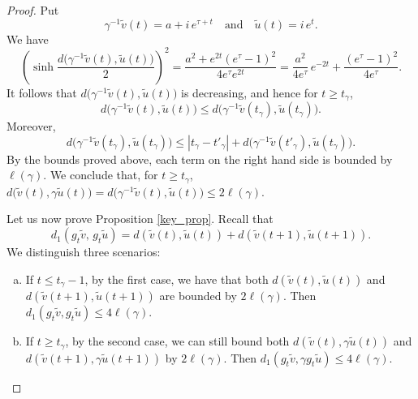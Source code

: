\documentclass[a4paper,english,reqno]{amsart}
\theoremstyle{definition}
\numberwithin{equation}{section}
\begin{document}
\begin{proof}
 	Put
 	\[
 	\gamma^{-1}\tilde v(t)=a+i\,e^{\tau+t}\quad\text{and}\quad \tilde u(t)=i\,e^{t}.
 	\]
 	We have \cite[\S7.20]{Beardon} 
 	\begin{equation*}%
 		\left(\sinh\frac{d\bigl(\gamma^{-1}\tilde v(t),\tilde u(t)\bigr)}{2}\right)^{2}
 		=
 		\frac{a^{2}+e^{2t}(e^{\tau}-1)^{2}}{4e^{\tau}e^{2t}}
 		=
 		\frac{a^{2}}{4e^{\tau}}\,e^{-2t}
 		+\frac{(e^{\tau}-1)^{2}}{4e^{\tau}}.
 	\end{equation*}
 	It follows that $d\bigl(\gamma^{-1}\tilde v(t),\tilde u(t)\bigr)$ is decreasing, and hence for $t\ge t_\gamma$,
 	\[
 	d\bigl(\gamma^{-1}\tilde v(t),\tilde u(t)\bigr)
 	\le d\bigl(\gamma^{-1}\tilde v(t_\gamma),\tilde u(t_\gamma)\bigr).
 	\]
 	Moreover,
 	\[
 	d\bigl(\gamma^{-1}\tilde v(t_\gamma),\tilde u(t_\gamma)\bigr)
 	\le |t_\gamma-t'_\gamma| + d\bigl(\gamma^{-1}\tilde v(t'_\gamma), \tilde u(t_\gamma) \bigr).
 	\]
 	By the bounds proved above, each term on the right hand side is bounded by $\ell (\gamma)$.
 	We conclude that, for $t\ge t_\gamma$, $d\bigl(\tilde v(t), \gamma \tilde u(t)\bigr) = d\bigl( \gamma^{-1} \tilde v(t), \tilde u(t)\bigr)  \le 2\ell(\gamma)$. 
 	
 	\smallskip
 	
 Let us now prove Proposition \ref{key_prop}. Recall that 
 \[
d_1\!\left(g_{t} \tilde v ,\, g_t\tilde u\right) = d(\tilde v (t), \tilde u (t)) + d(\tilde v (t+1), \tilde u (t+1)). 
 \]
 We distinguish three scenarios:
 
 \begin{enumerate}[(a)]
 	\item If $t \le t_\gamma -1 $, by the first case, we have that both
 	$d(\tilde v(t), \tilde u(t))$ and \\
 	$d(\tilde v(t+1), \tilde u(t+1))$
 	are bounded by $2\ell(\gamma)$. Then
 	$
 	d_1(g_{t}\tilde v, g_t \tilde u) \le 4\ell(\gamma).
 	$
 	
 	\item If $t \ge t_\gamma$, by the second case, we can still
 	bound both
 	$d(\tilde v(t), \gamma \tilde u(t))
 	$ and $ 
 	d(\tilde v(t+1), \gamma \tilde u(t+1))$
 	by $2\ell(\gamma)$. Then
 	$
 	d_1(g_{t}\tilde v, \gamma g_t \tilde u) \le 4 \ell(\gamma).
 	$
 	

\end{enumerate}
\end{proof}
\end{document}
